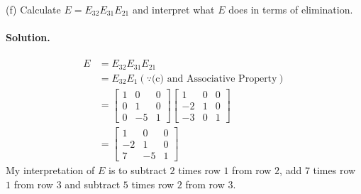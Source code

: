 (f) Calculate $E=E_{32}E_{31}E_{21}$ and interpret what $E$ does in terms of elimination.
\paragraph*{Solution.}
\begin{align*}
    E&=E_{32}E_{31}E_{21}\\
    &=E_{32}E_1 (\because \text{(c) and Associative Property})\\
    &=\begin{bmatrix}
        1&0&0\\0&1&0\\0&-5&1
    \end{bmatrix}\begin{bmatrix}
        1&0&0\\-2&1&0\\-3&0&1
    \end{bmatrix}\\
    &=\begin{bmatrix}
        1&0&0\\-2&1&0\\7&-5&1
    \end{bmatrix}
\end{align*}
My interpretation of $E$ is to subtract $2$ times row $1$ from row $2$, add $7$ times row $1$ from row $3$ and subtract $5$ times row $2$ from row $3$.\\

